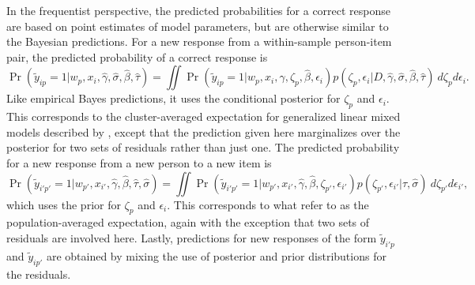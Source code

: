 \documentclass[12pt, letterpaper]{article}
\begin{document}
In the frequentist perspective, the predicted probabilities for a correct response are based on point estimates of model parameters, but are otherwise similar to the Bayesian predictions. For a new response from a within-sample person-item pair, the predicted probability of a correct response is
\begin{equation}
	\Pr(\tilde y_{ip} = 1| w_p, x_i, \hat \gamma, \hat \sigma, \hat \beta, \hat \tau) =
	\iint 
		\Pr(\tilde y_{ip} = 1| w_p, x_i, \hat \gamma, \zeta_p, \hat \beta, \epsilon_i)
		p(\zeta_p, \epsilon_i | D, \hat \gamma, \hat \sigma, \hat \beta, \hat \tau)
	~d \zeta_p d \epsilon_i
.\end{equation}
Like empirical Bayes predictions, it uses the conditional posterior for $\zeta_p$ and $\epsilon_i$. This corresponds to the cluster-averaged expectation for generalized linear mixed models described by \textcite{skrondal2009prediction}, except that the prediction given here marginalizes over the posterior for two sets of residuals rather than just one. The predicted probability for a new response from a new person to a new item is
\begin{equation}
	\Pr(\tilde y_{i'p'} = 1| w_{p'}, x_{i'}, \hat \gamma, \hat \beta, \hat \tau, \hat \sigma) =
	\iint 
		\Pr(\tilde y_{i'p'} = 1| w_{p'}, x_{i'}, \hat \gamma, \hat \beta, \zeta_{p'}, \epsilon_{i'})
		p(\zeta_{p'}, \epsilon_{i'} | \hat \tau, \hat \sigma)
	~d \zeta_{p'} d \epsilon_{i'}
,\end{equation}
which uses the prior for $\zeta_p$ and $\epsilon_i$. This corresponds to what \textcite{skrondal2009prediction} refer to as the population-averaged expectation, again with the exception that two sets of residuals are involved here. Lastly, predictions for new responses of the form $\tilde y_{i'p}$ and $\tilde y_{ip'}$ are obtained by mixing the use of posterior and prior distributions for the residuals.
\end{document}
